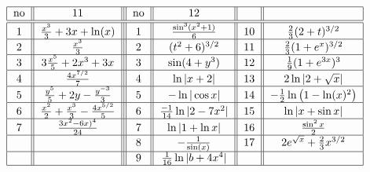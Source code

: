 \[ \begin{tabular}{| c || c || | c | | c | | c | | c | c | }
\hline  no &         ${ 11}                                                         $    & no     &        ${ 12}  $                           	         &          &       \\    \hline \hline
           $1$   &      $\frac{x^3}{3}+3x+\ln(x)                        $  & $1$  &   $\frac{\sin^3(x^2+1)}{6}$     		&$10$&  $\frac{2}{3}(2+t)^{3/2}$  \\ \hline 
           $2$   &      $ \frac{x^3}{3}                                              $   & $2$  &  $(t^2+6)^{3/2}       $          		&$11$&  $\frac{2}{3}(1+e^x)^{3/2}$ \\ \hline
           $3$   &      $3\frac{x^5}{5} + 2x^3+3x                         $   & $3$  & $\sin(4+y^3)	 $      &$12$&  $\frac{1}{9}(1+e^{3x})^3$  \\ \hline
           $4$   &      $\frac{4x^{7/2}}{7}                                       $   &  $4$ & $\ln| x+2|$    					&$13$&  $ 2\ln  | 2+\sqrt x | $\\ \hline 
           $5$   &      $\frac{y^5}{5}+2y-\frac{y^{-3}}{3}                   $   &  $5$ &  $-\ln| \cos x|$       		&$14$		&$-\frac{1}{ 2 }\ln\big( 1-\ln(x)^2 \big)$ \\ \hline
           $6$   &      $\frac{x^2}{2}+\frac{x^3}{3}-\frac{4x^{5/2}}{5}	 $    & $6$  & $\frac{-1}{14}\ln| 2 - 7 x^2|       $        &$15$& $\ln  |x+ \sin x | $ \\ \hline
           $7$   &      $\frac{3x^2-6x)^4}{24}   			 $    & $7$  & $ \ln |1 + \ln x|  $                  &$16$& $\frac{\sin^2x}{2}$  \\ \hline
                     &                        					      & $8$  & $-\frac{1}{\sin( x )}$                         &$17$ & $2e^{\sqrt x} + \frac{2}{3}x^{3/2} $\\ \hline
                     &      $      					         $     & $9$  & $ \frac{1}{16}\ln  | b+4x^4 | $                &          &                           \\  \hline
                 
             
\end{tabular} \]


